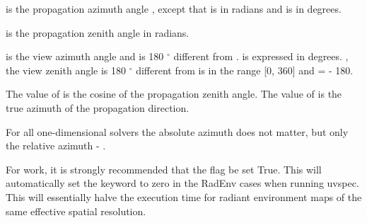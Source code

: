 \documentclass[a4paper,10pt,english]{sphinxmanual}
\begin{document}
\begin{fulllineitems}
\begin{fulllineitems}
 is the propagation azimuth angle , except that  is in radians and  is in degrees.

 is the propagation zenith angle in radians.

 is the view azimuth angle and is 180 \(^\circ\) different from .  is expressed
in degrees. , the view zenith angle is 180 \(^\circ\) different from  is in the range {[}0, 360{]} and  =  - 180.

The value of  is the cosine of the propagation zenith angle. The value of  is the true azimuth of
the propagation direction.

For all one-dimensional solvers the absolute azimuth does not matter, but only the relative azimuth
 - .

For  work, it is strongly recommended that the  flag be set True. This will automatically
set the  keyword to zero in the RadEnv cases when running uvspec. This will essentially halve the
execution time for radiant environment maps of the same effective spatial resolution.

\end{fulllineitems}



\end{fulllineitems}
\end{document}
